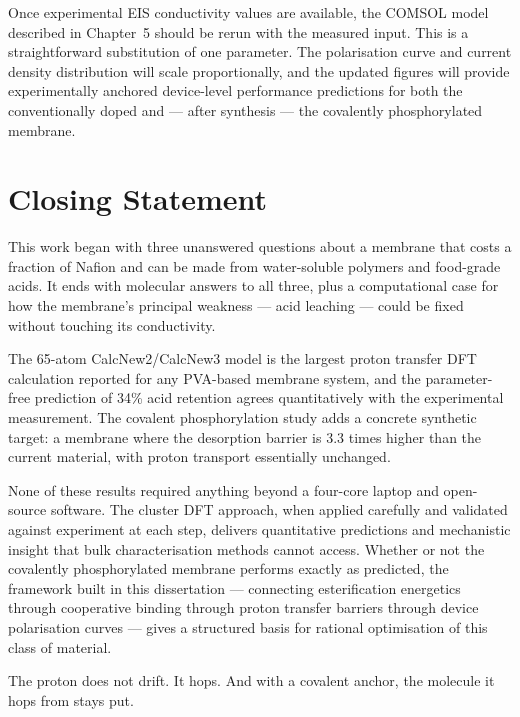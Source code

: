 \documentclass[12pt,a4paper]{report}
\begin{document}
Once experimental EIS conductivity values are available, 
the COMSOL model described in Chapter~5 should be 
rerun with the measured input. This is a straightforward 
substitution of one parameter. The polarisation curve 
and current density distribution will scale 
proportionally, and the updated figures will provide 
experimentally anchored device-level performance 
predictions for both the conventionally doped and 
— after synthesis — the covalently phosphorylated 
membrane.

\section{Closing Statement}

This work began with three unanswered questions about a 
membrane that costs a fraction of Nafion and can be made 
from water-soluble polymers and food-grade acids. It ends 
with molecular answers to all three, plus a computational 
case for how the membrane's principal weakness — acid 
leaching — could be fixed without touching its conductivity.

The 65-atom CalcNew2/CalcNew3 model is the largest proton 
transfer DFT calculation reported for any PVA-based membrane 
system, and the parameter-free prediction of 34\% acid 
retention agrees quantitatively with the experimental 
measurement. The covalent phosphorylation study adds a 
concrete synthetic target: a membrane where the desorption 
barrier is 3.3 times higher than the current material, 
with proton transport essentially unchanged.

None of these results required anything beyond a four-core 
laptop and open-source software. The cluster DFT approach, 
when applied carefully and validated against experiment at 
each step, delivers quantitative predictions and mechanistic 
insight that bulk characterisation methods cannot access. 
Whether or not the covalently phosphorylated membrane 
performs exactly as predicted, the framework built in this 
dissertation — connecting esterification energetics through 
cooperative binding through proton transfer barriers through 
device polarisation curves — gives a structured basis for 
rational optimisation of this class of material.

The proton does not drift. It hops. And with a covalent 
anchor, the molecule it hops from stays put.
\end{document}
